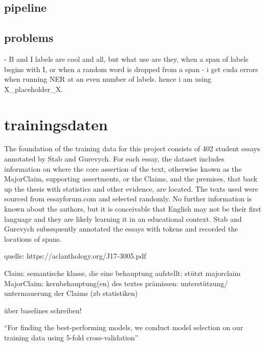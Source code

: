 \documentclass[12]{article}
\theoremstyle{mytheoremstyle}
\theoremstyle{mytheoremstyle}
\theoremstyle{myproblemstyle}
\begin{document}
  \subsection{pipeline}
  \subsection{problems} \label{problems}
  - B and I labels are cool and all, but what use are they, when a span of labels begins with I, or when a random word is dropped from a span
  - i get cuda errors when running NER at an even number of labels. hence i am using X\_placeholder\_X.
  \section{trainingsdaten\dotfill}
  The foundation of the training data for this project consists of 402 student essays annotated by Stab and Gurevych. For each essay, the dataset includes information on where the core assertion of the text, otherwise known as the MajorClaim, supporting assertments, or the Claims, and the premises, that back up the thesis with statistics and other evidence, are located. 
The texts used were sourced from essayforum.com and selected randomly. No further information is known about the authors, but it is conceivable that English may not be their first language and they are likely learning it in an educational context.
Stab and Gurevych subsequently annotated the essays with tokens and recorded the locations of spans.

  quelle: https://aclanthology.org/J17-3005.pdf

  Claim: semantische klasse, die eine behauptung aufstellt; stützt majorclaim 
  MajorClaim: kernbehauptung(en) des textes 
  prämissen: unterstützung/ untermauerung der Claims (zb statistiken) 

  über baselines schreiben!

  ``For finding the best-performing models, we conduct model selection on our training data using 5-fold cross-validation''
\end{document}

